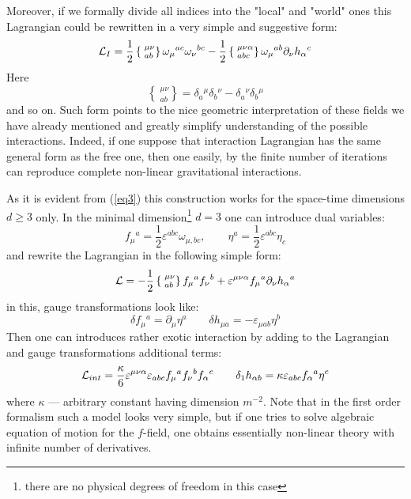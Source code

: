 \documentclass[a4paper,12pt]{article}
\begin{document}
Moreover, if we formally divide all indices into the "local" and
"world" ones this Lagrangian could be rewritten in a very simple and
suggestive form:
\begin{equation}
{\cal L}_I = \frac{1}{2} \left\{ \phantom{|}^{\mu\nu}_{ab}
 \right\} \omega_\mu{}^{ac} \omega_\nu{}^{bc} - \frac{1}{2}
\left\{ \phantom{|}^{\mu\nu\alpha}_{abc} \right\}
\omega_\mu{}^{ab} \partial_\nu h_\alpha{}^c \label{eq3}
\end{equation}
Here
$$
\left\{ \phantom{|}^{\mu\nu}_{ab} \right\} = \delta_a{}^\mu
\delta_b{}^\nu - \delta_a{}^\nu \delta_b{}^\mu
$$
and so on. Such form points to the nice geometric interpretation of
these fields we have already mentioned and greatly simplify
understanding of the possible interactions. Indeed, if one suppose
that interaction Lagrangian has the same general form as the free one,
then one easily, by the finite number of iterations can reproduce
complete non-linear gravitational interactions.

As it is evident from (\ref{eq3}) this construction works for the
space-time dimensions $d \ge 3$ only. In the minimal
dimension\footnote{there are no physical degrees of freedom in this
case} $d = 3$ one can introduce dual variables:
\begin{equation}
f_\mu{}^a = \frac{1}{2} \varepsilon^{abc} \omega_{\mu,bc}, \qquad
\eta^a = \frac{1}{2} \varepsilon^{abc} \eta_c
\end{equation}
and rewrite the Lagrangian in the following simple form:
\begin{equation}
{\cal L} = - \frac{1}{2} \left\{ \phantom{|}^{\mu\nu}_{ab} \right\}
f_\mu{}^a f_\nu{}^b + \varepsilon^{\mu\nu\alpha} f_\mu{}^a
\partial_\nu h_\alpha{}^a
\end{equation}
in this, gauge transformations look like:
$$
\delta f_\mu{}^a = \partial_\mu \eta^a \qquad \delta h_{\mu a} = -
\varepsilon_{\mu a b} \eta^b
$$
Then one can introduces rather exotic interaction \cite{BG00} by
adding to the Lagrangian and gauge transformations additional terms:
\begin{equation}
{\cal L}_{int} = \frac{\kappa}{6} \varepsilon^{\mu\nu\alpha}
\varepsilon_{abc} f_\mu{}^a f_\nu{}^b f_\alpha{}^c \qquad \delta_1
h_{\alpha b} = \kappa \varepsilon_{abc} f_\alpha{}^a \eta^c
\end{equation}
where $\kappa$ --- arbitrary constant having dimension $m^{-2}$.
Note that in the first order formalism such a model looks very simple,
but if one tries to solve algebraic equation of motion for the
$f$-field, one obtains essentially non-linear theory with infinite
number of derivatives.
\end{document}
